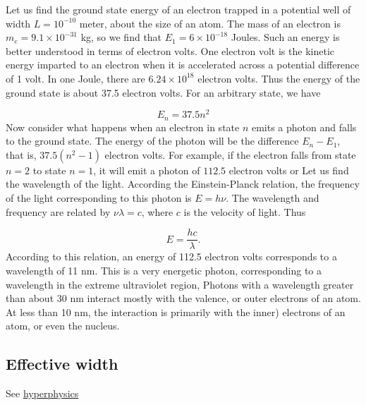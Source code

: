 
Let us find the ground state energy of an electron trapped in a potential well of width $L = 10^{-10}$ meter, about the size of an atom. The mass of an electron is $m_e = 9.1\times 10^{-31}$ kg, so we find that $E_1 = 6\times 10^{-18}$ Joules.  Such an energy is better understood in terms of electron volts.  One electron volt is the kinetic energy imparted to an electron when it is accelerated across a potential difference of 1 volt.  In one Joule, there are $6.24 \times 10^{18}$ electron volts.  Thus the energy of the ground state is about 37.5 electron volts.  For an arbitrary state, we have

\begin{equation}
E_n = 37.5n^2
\end{equation}
Now consider what happens when an electron in state $n$ emits a photon and falls to the ground state.  The energy of the photon will be the difference $E_n - E_1$, that is, $37.5(n^2 - 1)$ electron volts.
For example, if the electron falls from state $n = 2$ to state $n = 1$, it
will emit a photon of $112.5$ electron volts or   Let us find the wavelength of the light.
According the Einstein-Planck relation, the frequency of the light corresponding to this photon is $E = h\nu$. The wavelength and frequency are related by $\nu\lambda = c$, where $c$ is the velocity of light.  Thus

\begin{equation}
  E = \frac{hc}{\lambda}.
\end{equation}
According to this relation, an energy of 112.5 electron volts corresponds to a wavelength of 11 nm.  This is a very energetic photon, corresponding to a wavelength in the extreme ultraviolet region,  Photons with a wavelength greater than about 30 nm interact mostly with the valence, or outer electrons of an atom.  At less than 10 nm, the interaction is primarily with the inner) electrons of an atom, or even the nucleus.

\subsection{Effective width}


See \href{http://hyperphysics.phy-astr.gsu.edu/hbase/quantum/pfbox.html}{hyperphysics}
